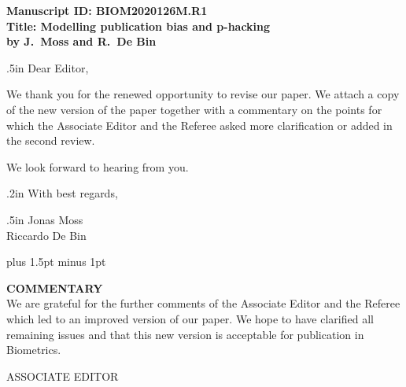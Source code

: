 \documentclass[11pt]{article}
\begin{document}
{\bf
\noindent Manuscript ID: BIOM2020126M.R1  \\
Title: Modelling publication bias and p-hacking \\
by J.\ Moss and R.\ De Bin}


\vglue .5in \noindent Dear Editor,


\vspace{0.5cm}

\noindent We thank you for the renewed opportunity to revise our paper. We attach a copy of the new  version of the paper together with a commentary on the points for which the Associate Editor and the Referee asked more clarification or added in the second review.


\vspace{0.3cm}

\noindent We look forward to hearing from you.%

\vglue .2in \noindent With best regards,

\vglue .5in
\noindent 
Jonas Moss\\
Riccardo De Bin \\

\pagestyle{empty}
\newpage



\parindent=0pt
\parskip=4pt plus 1.5pt minus 1pt


{\bf COMMENTARY} \\

We are grateful for the further comments of the Associate Editor and the Referee which led to an improved version of our paper. We hope to have clarified all remaining issues and that this new version is acceptable for publication in Biometrics.

\vspace{2cm}

\begin{center}
ASSOCIATE EDITOR
\end{center}
\end{document}

